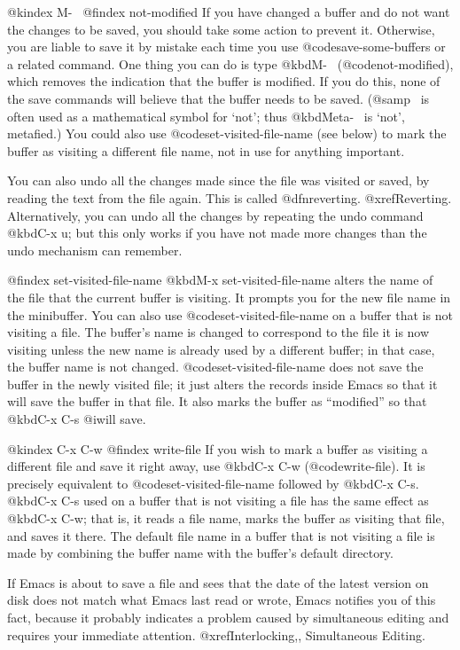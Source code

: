{{{{{{{{{{{{{{{{@kindex M-~
@findex not-modified
  If you have changed a buffer and do not want the changes to be saved,
you should take some action to prevent it.  Otherwise, you are liable to
save it by mistake each time you use @code{save-some-buffers} or a
related command.  One thing you can do is type @kbd{M-~}
(@code{not-modified}), which removes the indication that the buffer
is modified.  If you do this, none of the save commands will believe
that the buffer needs to be saved.  (@samp{~} is often used as a
mathematical symbol for `not'; thus @kbd{Meta-~} is `not', metafied.)
You could also use @code{set-visited-file-name} (see below) to mark the
buffer as visiting a different file name, not in use for
anything important. 

You can also undo all the changes made since the file was visited or
saved, by reading the text from the file again.  This is called
@dfn{reverting}.  @xref{Reverting}.  Alternatively, you can undo all the
changes by repeating the undo command @kbd{C-x u}; but this only works
if you have not made more changes than the undo mechanism can remember.

@findex set-visited-file-name
  @kbd{M-x set-visited-file-name} alters the name of the file that the
current buffer is visiting.  It prompts you for the new file name in the
minibuffer.  You can also use @code{set-visited-file-name} on a buffer
that is not visiting a file.  The buffer's name is changed to correspond
to the file it is now visiting unless the new name is already used by a
different buffer; in that case, the buffer name is not changed.
@code{set-visited-file-name} does not save the buffer in the newly
visited file; it just alters the records inside Emacs so that it will
save the buffer in that file.  It also marks the buffer as ``modified''
so that @kbd{C-x C-s} @i{will} save.

@kindex C-x C-w
@findex write-file
  If you wish to mark a buffer as visiting a different file and save it
right away, use @kbd{C-x C-w} (@code{write-file}).  It is precisely
equivalent to @code{set-visited-file-name} followed by @kbd{C-x C-s}.
@kbd{C-x C-s} used on a buffer that is not visiting  a file has the
same effect as @kbd{C-x C-w}; that is, it reads a file name, marks the
buffer as visiting that file, and saves it there.  The default file name in
a buffer that is not visiting a file is made by combining the buffer name
with the buffer's default directory.

  If Emacs is about to save a file and sees that the date of the latest
version on disk does not match what Emacs last read or wrote, Emacs
notifies you of this fact, because it probably indicates a problem caused
by simultaneous editing and requires your immediate attention.
@xref{Interlocking,, Simultaneous Editing}.

}}}}}}}}}}}}}}}}
